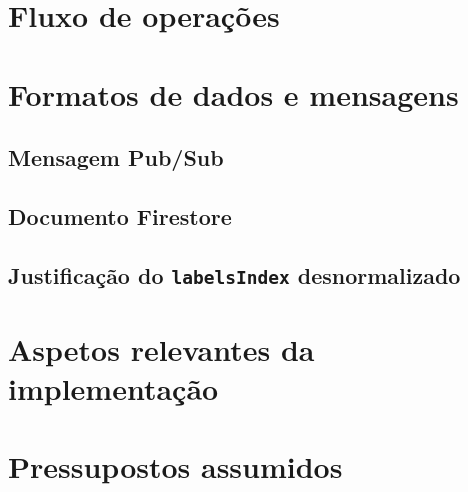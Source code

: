 \documentclass[11pt,a4paper]{article}
\begin{document}
\section{Fluxo de opera\c{c}\~oes}
\label{sec:fluxo}

\section{Formatos de dados e mensagens}
\label{sec:dados}

\subsection{Mensagem Pub/Sub}

\subsection{Documento Firestore}

\subsection{Justifica\c{c}\~ao do \texttt{labelsIndex} desnormalizado}

\section{Aspetos relevantes da implementa\c{c}\~ao}
\label{sec:impl}

\section{Pressupostos assumidos}
\label{sec:pressupostos}
\end{document}
